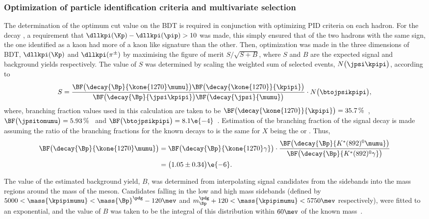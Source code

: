 \subsubsection{Optimization of particle identification criteria and multivariate selection}
\label{sssec:opt:kpipi}
The determination of the optimum cut value on the BDT is required in conjunction with optimizing PID
criteria on each hadron.
For the decay \btokpipimumu, a requirement that $\dllkpi(\Kp)-\dllkpi(\pip)>10$ was made, this
simply ensured that of the two hadrons with the same sign, the one identified as a kaon had more of
a kaon like signature than the other.
Then, optimization was made in the three dimensions of BDT, $\dllkpi(\Kp)$ and $\dllkpi(\pi^\pm)$
by maximising the figure of merit $S/\sqrt{S+B}$, where $S$ and $B$ are the expected signal and
background yields respectively.
The value of $S$ was determined by scaling the weighted sum of selected \btojpsikpipi events,
$N\big(\jpsi\kpipi\big)$, according to
\begin{equation}
  S =
  \frac{
    \BF\big(\decay{\Bp}{\kone{1270}\mumu}\big)
    \BF\big(\decay{\kone{1270}}{\kpipi}\big)
  }{
    \BF\big(\decay{\Bp}{\jpsi\kpipi}\big)
    \BF\big(\decay{\jpsi}{\mumu}\big)
  }
  \cdot
  N\big(\btojpsikpipi\big),
\end{equation}
where, branching fraction values used in this calculation are taken to be
$\BF\big(\decay{\kone{1270}}{\kpipi}\big) = 35.7\,\%$~\cite{PDG2012},
$\BF\big(\jpsitomumu\big) = 5.93\,\%$~\cite{PDG2012} and
$\BF\big(\btojpsikpipi\big) = 8.1\e{-4}$~\cite{PDG2012}.
Estimation of the branching fraction of the signal decay  is made
assuming the ratio of the branching fractions for the known decays  to
is the same for $X$ being the  or \Kstarent.
Thus,
\begin{align}
  \BF\big(\decay{\Bp}{\kone{1270}\mumu}\big)
  &=
  \BF\big(\decay{\Bp}{\kone{1270}\gamma}\big)
  \cdot\frac{
    \BF\big(\decay{\Bp}{K^*(892)^0\mumu}\big)
  }{
  \BF\big(\decay{\Bp}{K^*(892)^0\gamma}\big)
  }\nonumber\\
  &=\big(1.05\pm0.34\big)\e{-6}.
\end{align}


The value of the estimated background yield, $B$, was determined from interpolating signal
\btokpipimumu candidates from the sidebands into the mass regions around the mass of the \Bp meson.
Candidates falling in the low and high mass sidebands
(defined by $5000<\mass{\kpipimumu}<\mass{\Bp}^\pdg-120\mev$ and
$m_{\Bp}^\pdg+120<\mass{\kpipimumu}<5750\mev$ respectively),
were fitted to an exponential, and the value of $B$ was taken to be the integral of this
distribution within $60\mev$ of the known \Bp mass~\cite{PDG2012}.

